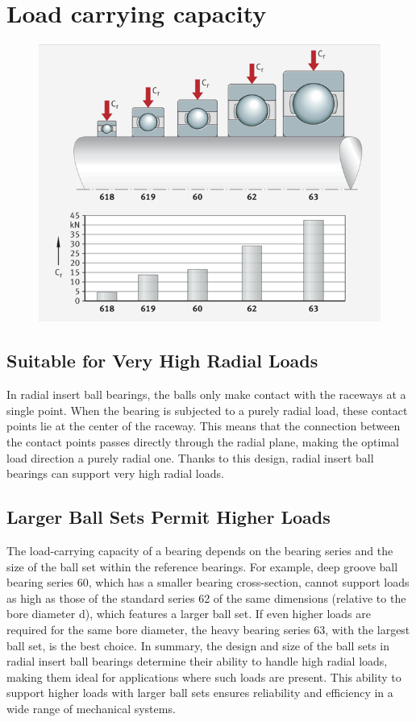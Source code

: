 \documentclass[../../main]{subfiles}
\begin{document}
\section{Load carrying capacity}
\begin{figure}[h!]
  \centering
  \includegraphics[width=\textwidth]{img/Picture5.png}
  \caption{}
  \end{figure}

\subsection{Suitable for Very High Radial Loads}
In radial insert ball bearings, the balls only make contact with the raceways at a single point. When the bearing is subjected to a purely radial load, these contact points lie at the center of the raceway. This means that the connection between the contact points passes directly through the radial plane, making the optimal load direction a purely radial one. Thanks to this design, radial insert ball bearings can support very high radial loads.

\subsection{Larger Ball Sets Permit Higher Loads}

The load-carrying capacity of a bearing depends on the bearing series and the size of the ball set within the reference bearings. For example, deep groove ball bearing series 60, which has a smaller bearing cross-section, cannot support loads as high as those of the standard series 62 of the same dimensions (relative to the bore diameter d), which features a larger ball set. If even higher loads are required for the same bore diameter, the heavy bearing series 63, with the largest ball set, is the best choice.
In summary, the design and size of the ball sets in radial insert ball bearings determine their ability to handle high radial loads, making them ideal for applications where such loads are present. This ability to support higher loads with larger ball sets ensures reliability and efficiency in a wide range of mechanical systems.
\end{document}
